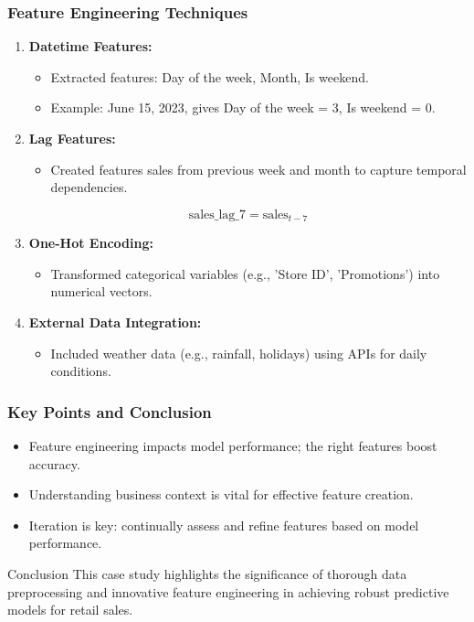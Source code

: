 \documentclass[aspectratio=169]{beamer}
\begin{document}
\begin{frame}[fragile]
    \frametitle{Feature Engineering Techniques}
    \begin{enumerate}
        \item \textbf{Datetime Features:}
        \begin{itemize}
            \item Extracted features: Day of the week, Month, Is weekend.
            \item Example: June 15, 2023, gives Day of the week = 3, Is weekend = 0.
        \end{itemize}
        
        \item \textbf{Lag Features:}
        \begin{itemize}
            \item Created features sales from previous week and month to capture temporal dependencies.
        \end{itemize}
        \begin{equation}
            \text{sales\_lag\_7} = \text{sales}_{t-7}
        \end{equation}
        
        \item \textbf{One-Hot Encoding:}
        \begin{itemize}
            \item Transformed categorical variables (e.g., 'Store ID', 'Promotions') into numerical vectors.
        \end{itemize}
        
        \item \textbf{External Data Integration:}
        \begin{itemize}
            \item Included weather data (e.g., rainfall, holidays) using APIs for daily conditions.
        \end{itemize}
    \end{enumerate}
\end{frame}

\begin{frame}[fragile]
    \frametitle{Key Points and Conclusion}
    \begin{itemize}
        \item Feature engineering impacts model performance; the right features boost accuracy.
        \item Understanding business context is vital for effective feature creation.
        \item Iteration is key: continually assess and refine features based on model performance.
    \end{itemize}
    \begin{block}{Conclusion}
        This case study highlights the significance of thorough data preprocessing and innovative feature engineering in achieving robust predictive models for retail sales.
    \end{block}
\end{frame}
\end{document}
